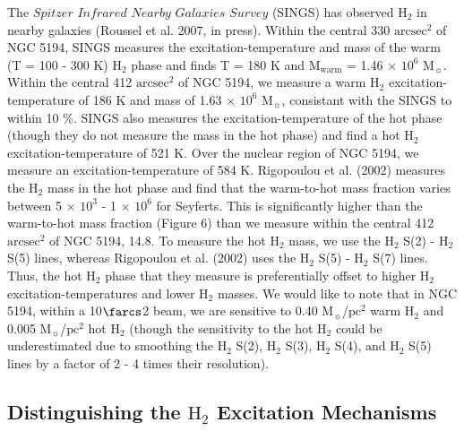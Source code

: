 \documentclass[manuscript]{aastex}
\begin{document}
The $Spitzer$ $Infrared$ $Nearby$ $Galaxies$ $Survey$ (SINGS) has observed $\mathrm{H_2}$ in nearby galaxies (Roussel et al. 2007, in press).  Within the central 330 $\mathrm{arcsec^2}$ of NGC 5194, SINGS measures the excitation-temperature and mass of the warm (T = 100 - 300 K) $\mathrm{H_2}$ phase and finds T = 180 K and $\mathrm{M_{warm}}$ = 1.46 $\times$ $\mathrm{10^6}$ $\mathrm{M_\sun}$.  Within the central 
412 $\mathrm{arcsec^2}$ of NGC 5194, we measure a warm $\mathrm{H_2}$ excitation-temperature of 186 K and mass of 1.63 $\times$ $\mathrm{10^6}$ $\mathrm{M_\sun}$, consistant with the SINGS to within 10 \%.  SINGS also measures the excitation-temperature of the hot phase (though they do not measure the mass in the hot phase) and find a hot $\mathrm{H_2}$ excitation-temperature of 521 K.  Over the nuclear region of NGC 5194, we measure an excitation-temperature of 584 K.  Rigopoulou et al. (2002) measures the $\mathrm{H_2}$ mass in the hot phase and find that the warm-to-hot mass fraction varies between 5 $\times$ $\mathrm{10^3}$ - 1 $\times$ $\mathrm{10^6}$ for Seyferts.  This is significantly higher than the warm-to-hot mass fraction (Figure 6) than we measure within the central 412 $\mathrm{arcsec^2}$ of NGC 5194, 14.8.  To measure the hot $\mathrm{H_2}$ mass, we use the $\mathrm{H_2}$ S(2) - $\mathrm{H_2}$ S(5) lines, whereas Rigopoulou et al. (2002) uses the $\mathrm{H_2}$ S(5) - $\mathrm{H_2}$ S(7) lines.  Thus, the hot $\mathrm{H_2}$ phase that they measure is preferentially offset to higher $\mathrm{H_2}$ excitation-temperatures and lower $\mathrm{H_2}$ masses.  We would like to note that in NGC 5194, within a 10$\farcs$2 beam, we are sensitive to 
0.40 $\mathrm{M_\sun}$/$\mathrm{pc^2}$ warm $\mathrm{H_2}$ and 0.005 $\mathrm{M_\sun}$/$\mathrm{pc^2}$ hot $\mathrm{H_2}$ (though the sensitivity to the hot $\mathrm{H_2}$ could be underestimated due to smoothing the $\mathrm{H_2}$ S(2), $\mathrm{H_2}$ S(3), $\mathrm{H_2}$ S(4), and $\mathrm{H_2}$ S(5) lines by a factor of 2 - 4 times their resolution).

\subsection{Distinguishing the $\mathrm{H_2}$ Excitation Mechanisms}
\end{document}
